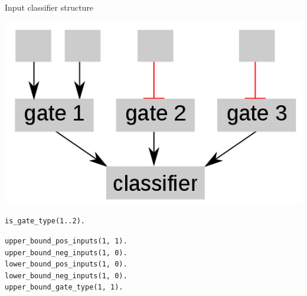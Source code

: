 \documentclass[10pt,dvipsnames]{beamer}
\begin{document}
\begin{frame}[fragile]{Input classifier structure}
\begin{center}
\includegraphics[scale=0.25]{classifier.png}
\end{center}
\vspace{0.3cm}

\begin{verbatim}
is_gate_type(1..2).
\end{verbatim}

\begin{verbatim}
upper_bound_pos_inputs(1, 1). 
upper_bound_neg_inputs(1, 0). 
lower_bound_pos_inputs(1, 0). 
lower_bound_neg_inputs(1, 0). 
upper_bound_gate_type(1, 1). 
\end{verbatim}

\end{frame}
\end{document}
